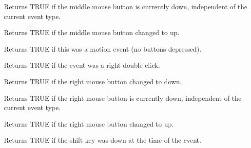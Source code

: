 \label{wxmouseeventmiddleisdown}


Returns TRUE if the middle mouse button is currently down, independent
of the current event type.



Returns TRUE if the middle mouse button changed to up.



Returns TRUE if this was a motion event (no buttons depressed).



Returns TRUE if the event was a right double click.



Returns TRUE if the right mouse button changed to down.

\label{wxmouseeventrightisdown}


Returns TRUE if the right mouse button is currently down, independent
of the current event type.



Returns TRUE if the right mouse button changed to up.



Returns TRUE if the shift key was down at the time of the event.

